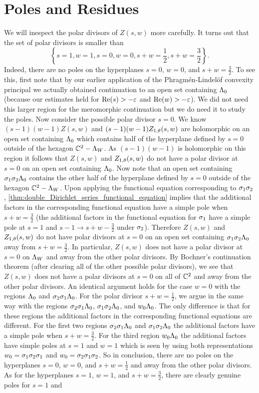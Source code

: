 \documentclass[12pt,reqno,oneside]{amsart}
\begin{document}
\section{Poles and Residues}
    We will inespect the polar divisors of $Z(s,w)$ more carefully. It turns out that the set of polar divisors is smaller than
    \[
        \left\{s = 1, w = 1, s = 0, w = 0, s+w = \frac{1}{2}, s+w = \frac{3}{2}\right\}.
    \]
    Indeed, there are no poles on the hyperplanes $s = 0$, $w = 0$, and $s+w = \frac{3}{2}$. To see this, first note that by our earlier application of the Phragm\'en-Lindel\"of convexity principal we actually obtained continuation to an open set containing $\Lambda_{0}$ (because our estimates held for $\mathrm{Re}(s) > -\varepsilon$ and $\mathrm{Re}(w) > -\varepsilon$). We did not need this larger region for the meromorphic continuation but we do need it to study the poles. Now consider the possible polar divisor $s = 0$. We know $(s-1)(w-1)Z(s,w)$ and $(s-1)(w-1)Z_{1,\theta}(s,w)$ are holomorphic on an open set containing $\Lambda_{0}$ which contains half of the hyperplane defined by $s = 0$ outside of the hexagon $\mathbb{C}^{2}-\Lambda_{W}$. As $(s-1)(w-1)$ is holomorphic on this region it follows that $Z(s,w)$ and $Z_{1,\theta}(s,w)$ do not have a polar divisor at $s = 0$ on an open set containing $\Lambda_{0}$. Now note that an open set containing $\sigma_{1}\sigma_{2}\Lambda_{0}$ contains the other half of the hyperplane defined by $s = 0$ outside of the hexagon $\mathbb{C}^{2}-\Lambda_{W}$. Upon applying the functional equation corresponding to $\sigma_{1}\sigma_{2}$, \cref{thm:double_Dirichlet_series_functional_equation} implies that the additional factors in the corresponding functional equation have a simple pole when $s+w = \frac{3}{2}$ (the additional factors in the functional equation for $\sigma_{1}$ have a simple pole at $s = 1$ and $s-1 \to s+w-\frac{3}{2}$ under $\sigma_{2}$). Therefore $Z(s,w)$ and $Z_{1,\theta}(s,w)$ do not have polar divisors at $s = 0$ on an open set containing $\sigma_{1}\sigma_{2}\Lambda_{0}$ away from $s+w = \frac{3}{2}$. In particular, $Z(s,w)$ does not have a polar divisor at $s = 0$ on $\Lambda_{W}$ and away from the other polar divisors. By Bochner's continuation theorem (after clearing all of the other possible polar divisors), we see that $Z(s,w)$ does not have a polar divisors at $s = 0$ on all of $\mathbb{C}^{2}$ and away from the other polar divisors. An identical argument holds for the case $w = 0$ with the regions $\Lambda_{0}$ and $\sigma_{2}\sigma_{1}\Lambda_{0}$. For the polar divisor $s+w = \frac{1}{2}$, we argue in the same way with the regions $\sigma_{2}\sigma_{1}\Lambda_{0}$, $\sigma_{1}\sigma_{2}\Lambda_{0}$, and $w_{0}\Lambda_{0}$. The only difference is that for these regions the additional factors in the corresponding functional equations are different. For the first two regions $\sigma_{2}\sigma_{1}\Lambda_{0}$ and $\sigma_{1}\sigma_{2}\Lambda_{0}$ the additional factors have a simple pole when $s+w = \frac{3}{2}$. For the third region $w_{0}\Lambda_{0}$ the additional factors have simple poles at $s = 1$ and $w = 1$ which is seen by using both representations $w_{0} = \sigma_{1}\sigma_{2}\sigma_{1}$ and $w_{0} = \sigma_{2}\sigma_{1}\sigma_{2}$. So in conclusion, there are no poles on the hyperplanes $s = 0$, $w = 0$, and $s+w = \frac{1}{2}$ and away from the other polar divisors. As for the hyperplanes $s = 1$, $w = 1$, and $s+w = \frac{3}{2}$, there are clearly genuine poles for $s = 1$ and 
\end{document}
